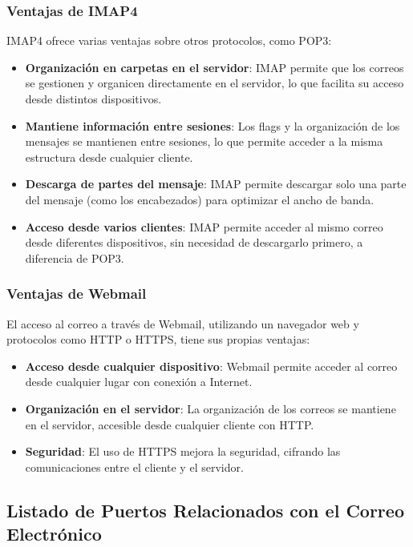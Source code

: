 \documentclass[a4paper,12pt]{article}
\begin{document}
\subsubsection{Ventajas de IMAP4}

IMAP4 ofrece varias ventajas sobre otros protocolos, como POP3:

\begin{itemize}
    \item \textbf{Organización en carpetas en el servidor}: IMAP permite que los correos se gestionen y organicen directamente en el servidor, lo que facilita su acceso desde distintos dispositivos.
    \item \textbf{Mantiene información entre sesiones}: Los flags y la organización de los mensajes se mantienen entre sesiones, lo que permite acceder a la misma estructura desde cualquier cliente.
    \item \textbf{Descarga de partes del mensaje}: IMAP permite descargar solo una parte del mensaje (como los encabezados) para optimizar el ancho de banda.
    \item \textbf{Acceso desde varios clientes}: IMAP permite acceder al mismo correo desde diferentes dispositivos, sin necesidad de descargarlo primero, a diferencia de POP3.
\end{itemize}

\subsubsection{Ventajas de Webmail}

El acceso al correo a través de Webmail, utilizando un navegador web y protocolos como HTTP o HTTPS, tiene sus propias ventajas:

\begin{itemize}
    \item \textbf{Acceso desde cualquier dispositivo}: Webmail permite acceder al correo desde cualquier lugar con conexión a Internet.
    \item \textbf{Organización en el servidor}: La organización de los correos se mantiene en el servidor, accesible desde cualquier cliente con HTTP.
    \item \textbf{Seguridad}: El uso de HTTPS mejora la seguridad, cifrando las comunicaciones entre el cliente y el servidor.
\end{itemize}
\subsection{Listado de Puertos Relacionados con el Correo Electrónico}
\end{document}
